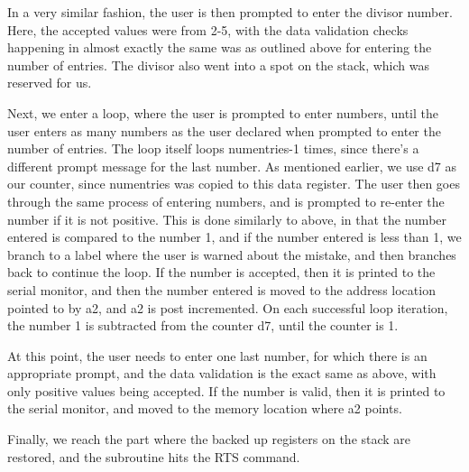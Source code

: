 \documentclass[letterpaper]{article}
\begin{document}
    In a very similar fashion, the user is then prompted to enter the divisor number.
    Here, the accepted values were from 2-5, with the data validation checks happening in
    almost exactly the same was as outlined above for entering the number of entries.
    The divisor also went into a spot on the stack, which was reserved for us.

    Next, we enter a loop, where the user is prompted to enter numbers, until
    the user enters as many numbers as the user declared when prompted to enter the number of entries.
    The loop itself loops numentries-1 times, since there's a different prompt message for the
    last number. As mentioned earlier, we use d7 as our counter, since numentries was
    copied to this data register. The user then goes through the same process of
    entering numbers, and is prompted to re-enter the number if it is not positive.
    This is done similarly to above, in that the number entered is compared to the
    number 1, and if the number entered is less than 1, we branch to a label where
    the user is warned about the mistake, and then branches back to continue the loop.
    If the number is accepted, then it is printed to the serial monitor, and then the
    number entered is moved to the address location pointed to by a2, and a2 is post
    incremented. On each successful loop iteration, the number 1 is subtracted from
    the counter d7, until the counter is 1.

    At this point, the user needs to enter one last number, for which there is
    an appropriate prompt, and the data validation is the exact same as above,
    with only positive values being accepted. If the number is valid, then it is
    printed to the serial monitor, and moved to the memory location where a2 points.

    Finally, we reach the part where the backed up registers on the stack are restored,
    and the subroutine hits the RTS command.

\end{document}
